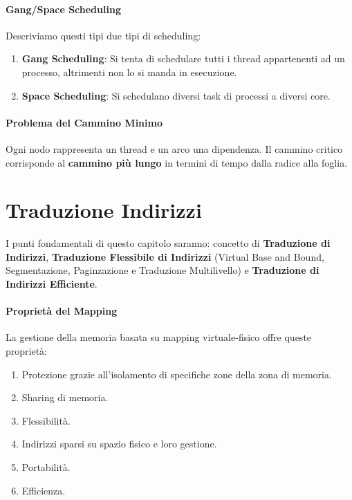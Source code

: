 \documentclass{article}
\begin{document}
\paragraph{Gang/Space Scheduling} Descriviamo questi tipi due tipi di scheduling:

\begin{enumerate}
    \item \textbf{Gang Scheduling}: Si tenta di schedulare tutti i thread appartenenti ad un processo, altrimenti non lo si manda in esecuzione.
    \item \textbf{Space Scheduling}: Si schedulano diversi task di processi a diversi core.
\end{enumerate}

\paragraph{Problema del Cammino Minimo} Ogni nodo rappresenta un thread e un arco una dipendenza. Il cammino critico corrisponde al \textbf{cammino più lungo} in termini di tempo dalla radice alla foglia.

\newpage

\section{Traduzione Indirizzi}

I punti fondamentali di questo capitolo saranno: concetto di \textbf{Traduzione di Indirizzi}, \textbf{Traduzione Flessibile di Indirizzi} (Virtual Base and Bound, Segmentazione, Paginzazione e Traduzione Multilivello) e \textbf{Traduzione di Indirizzi Efficiente}.

\paragraph{Proprietà del Mapping} La gestione della memoria basata su mapping virtuale-fisico offre queste proprietà:

\begin{enumerate}
    \item Protezione grazie all'isolamento di specifiche zone della zona di memoria.
    \item Sharing di memoria.
    \item Flessibilità.
    \item Indirizzi sparsi su spazio fisico e loro gestione.
    \item Portabilità.
    \item Efficienza.
\end{enumerate}
\end{document}
